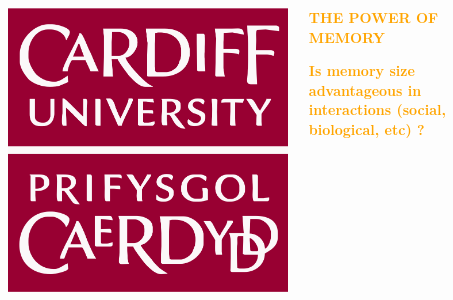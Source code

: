 \documentclass[usenames,dvipsnames,t]{beamer}
\begin{document}
\begin{columns}
    \begin{column}{.02\linewidth}
    \end{column}
    \begin{column}{.1\linewidth}
        \vspace{1cm}

        \begin{center}
        \includegraphics[width=.7\textwidth]{static/cardiff_uni_logo}
        \end{center}
    \end{column}
    \begin{column}{.7\linewidth}
    \vspace{1.5cm}

    \centering
    \textbf{\textcolor{orange}{\fontsize{110}{120} \selectfont THE POWER OF MEMORY}}
    \vspace{0.7cm}

    \textbf{\Large\textcolor{orange}{Is memory size advantageous in interactions (social,
    biological, etc) ?}}
    \end{column}
    \begin{column}{.2\linewidth}
        
        \begin{center}
            
        \end{center}
        \end{column}

    \begin{column}{.02\linewidth}
    \end{column}
\end{columns}
\vspace{1cm}
\end{document}
